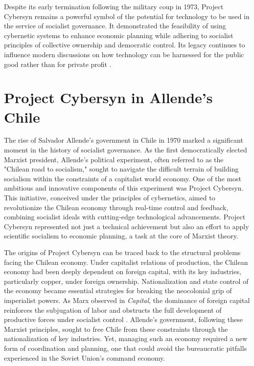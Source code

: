 \begin{refsection}
Despite its early termination following the military coup in 1973, Project Cybersyn remains a powerful symbol of the potential for technology to be used in the service of socialist governance. It demonstrated the feasibility of using cybernetic systems to enhance economic planning while adhering to socialist principles of collective ownership and democratic control. Its legacy continues to influence modern discussions on how technology can be harnessed for the public good rather than for private profit \cite[pp.~216-217]{medina2014}.

\section{Project Cybersyn in Allende's Chile}

The rise of Salvador Allende's government in Chile in 1970 marked a significant moment in the history of socialist governance. As the first democratically elected Marxist president, Allende's political experiment, often referred to as the "Chilean road to socialism," sought to navigate the difficult terrain of building socialism within the constraints of a capitalist world economy. One of the most ambitious and innovative components of this experiment was Project Cybersyn. This initiative, conceived under the principles of cybernetics, aimed to revolutionize the Chilean economy through real-time control and feedback, combining socialist ideals with cutting-edge technological advancements. Project Cybersyn represented not just a technical achievement but also an effort to apply scientific socialism to economic planning, a task at the core of Marxist theory.

The origins of Project Cybersyn can be traced back to the structural problems facing the Chilean economy. Under capitalist relations of production, the Chilean economy had been deeply dependent on foreign capital, with its key industries, particularly copper, under foreign ownership. Nationalization and state control of the economy became essential strategies for breaking the neocolonial grip of imperialist powers. As Marx observed in \textit{Capital}, the dominance of foreign capital reinforces the subjugation of labor and obstructs the full development of productive forces under socialist control \cite[pp.~929-931]{marx2008}. Allende's government, following these Marxist principles, sought to free Chile from these constraints through the nationalization of key industries. Yet, managing such an economy required a new form of coordination and planning, one that could avoid the bureaucratic pitfalls experienced in the Soviet Union's command economy.


\end{refsection}
